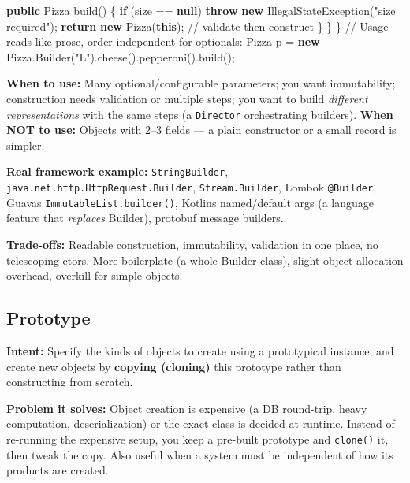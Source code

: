 \documentclass[11pt]{article}
\newenvironment{Shaded}{\begin{snugshade}}{\end{snugshade}}
\newcommand{\BuiltInTok}[1]{\textcolor[rgb]{0.50,0.55,0.55}{#1}}
\newcommand{\CommentTok}[1]{\textcolor[rgb]{0.48,0.49,0.49}{#1}}
\newcommand{\ControlFlowTok}[1]{\textcolor[rgb]{0.99,0.74,0.29}{\textbf{#1}}}
\newcommand{\FunctionTok}[1]{\textcolor[rgb]{0.56,0.27,0.68}{#1}}
\newcommand{\KeywordTok}[1]{\textcolor[rgb]{0.81,0.81,0.76}{\textbf{#1}}}
\newcommand{\NormalTok}[1]{\textcolor[rgb]{0.81,0.81,0.76}{#1}}
\newcommand{\OperatorTok}[1]{\textcolor[rgb]{0.81,0.81,0.76}{#1}}
\newcommand{\StringTok}[1]{\textcolor[rgb]{0.96,0.31,0.31}{#1}}
\begin{document}
\begin{Shaded}
\begin{Highlighting}[]
        \KeywordTok{public}\NormalTok{ Pizza }\FunctionTok{build}\OperatorTok{()} \OperatorTok{\{}
            \ControlFlowTok{if} \OperatorTok{(}\NormalTok{size }\OperatorTok{==} \KeywordTok{null}\OperatorTok{)} \ControlFlowTok{throw} \KeywordTok{new} \BuiltInTok{IllegalStateException}\OperatorTok{(}\StringTok{"size required"}\OperatorTok{);}
            \ControlFlowTok{return} \KeywordTok{new} \FunctionTok{Pizza}\OperatorTok{(}\KeywordTok{this}\OperatorTok{);}                  \CommentTok{// validate{-}then{-}construct}
        \OperatorTok{\}}
    \OperatorTok{\}}
\OperatorTok{\}}
\CommentTok{// Usage — reads like prose, order{-}independent for optionals:}
\NormalTok{Pizza p }\OperatorTok{=} \KeywordTok{new}\NormalTok{ Pizza}\OperatorTok{.}\FunctionTok{Builder}\OperatorTok{(}\StringTok{"L"}\OperatorTok{).}\FunctionTok{cheese}\OperatorTok{().}\FunctionTok{pepperoni}\OperatorTok{().}\FunctionTok{build}\OperatorTok{();}
\end{Highlighting}
\end{Shaded}

\textbf{When to use:} Many optional/configurable parameters; you want immutability; construction needs validation or multiple steps; you want to build \emph{different representations} with the same steps (a \texttt{Director} orchestrating builders). \textbf{When NOT to use:} Objects with 2--3 fields --- a plain constructor or a small record is simpler.

\textbf{Real framework example:} \texttt{StringBuilder}, \texttt{java.net.http.HttpRequest.Builder}, \texttt{Stream.Builder}, Lombok \texttt{@Builder}, Guava\textquotesingle s \texttt{ImmutableList.builder()}, Kotlin\textquotesingle s named/default args (a language feature that \emph{replaces} Builder), protobuf message builders.

\textbf{Trade-offs:} Readable construction, immutability, validation in one place, no telescoping ctors. More boilerplate (a whole Builder class), slight object-allocation overhead, overkill for simple objects.

\subsection{Prototype}\label{prototype}

\textbf{Intent:} Specify the kinds of objects to create using a prototypical instance, and create new objects by \textbf{copying (cloning)} this prototype rather than constructing from scratch.

\textbf{Problem it solves:} Object creation is expensive (a DB round-trip, heavy computation, deserialization) or the exact class is decided at runtime. Instead of re-running the expensive setup, you keep a pre-built prototype and \texttt{clone()} it, then tweak the copy. Also useful when a system must be independent of how its products are created.
\end{document}
